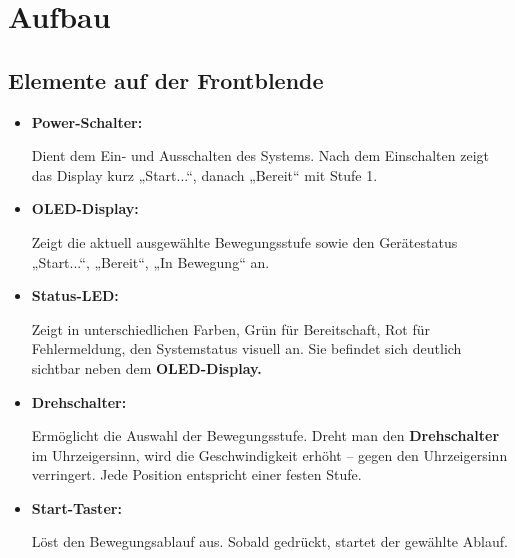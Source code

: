\documentclass[a4paper,12pt]{report}
\begin{document}
	\section {Aufbau}
	\subsection {Elemente auf der Frontblende }
	\begin{itemize}[leftmargin=1.5em]
		
		\item \textbf{Power-Schalter:}
		
		Dient dem Ein- und Ausschalten des Systems. Nach dem Einschalten zeigt das Display kurz „Start...“, danach „Bereit“ mit Stufe 1. \\
		
		\item \textbf{OLED-Display:} 
		
		Zeigt die aktuell ausgewählte Bewegungsstufe sowie den Gerätestatus „Start...“, „Bereit“, „In Bewegung“ an.\\
		
		\item \textbf{Status-LED:}
		
		Zeigt in unterschiedlichen Farben, Grün für Bereitschaft, Rot für Fehlermeldung, den Systemstatus visuell an. Sie befindet sich deutlich sichtbar neben dem \textbf{OLED-Display.}\\ 
		
		\item \textbf{Drehschalter:} 
		
		Ermöglicht die Auswahl der Bewegungsstufe. Dreht man den \textbf{Drehschalter} im Uhrzeigersinn, wird die Geschwindigkeit erhöht – gegen den Uhrzeigersinn verringert. Jede Position entspricht einer festen Stufe.\\
		
		\item \textbf{Start-Taster:}
		
		Löst den Bewegungsablauf aus. Sobald gedrückt, startet der gewählte Ablauf.\\ 
		
	\end{itemize}
	\newpage
	
\end{document}

